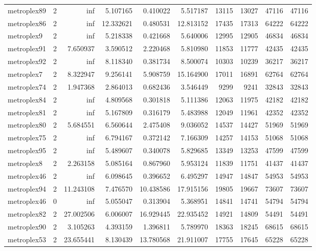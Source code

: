 \begin{longtable}{|l|r|r|r|r|r|r|r|r|r|}
metroplex89 & 2 & inf & 5.107165 & 0.410022 & 5.517187 & 13115 & 13027 & 47116 & 47116 \\
metroplex86 & 2 & inf & 12.332621 & 0.480531 & 12.813152 & 17435 & 17313 & 64222 & 64222 \\
metroplex9 & 2 & inf & 5.218338 & 0.421668 & 5.640006 & 12995 & 12905 & 46834 & 46834 \\
metroplex91 & 2 & 7.650937 & 3.590512 & 2.220468 & 5.810980 & 11853 & 11777 & 42435 & 42435 \\
metroplex92 & 2 & inf & 8.118340 & 0.381734 & 8.500074 & 10303 & 10239 & 36217 & 36217 \\
metroplex7 & 2 & 8.322947 & 9.256141 & 5.908759 & 15.164900 & 17011 & 16891 & 62764 & 62764 \\
metroplex74 & 2 & 1.947368 & 2.864013 & 0.682436 & 3.546449 & 9299 & 9241 & 32843 & 32843 \\
metroplex84 & 2 & inf & 4.809568 & 0.301818 & 5.111386 & 12063 & 11975 & 42182 & 42182 \\
metroplex81 & 2 & inf & 5.167809 & 0.316179 & 5.483988 & 12049 & 11961 & 42352 & 42352 \\
metroplex80 & 2 & 5.684551 & 6.560644 & 2.475408 & 9.036052 & 14537 & 14427 & 51969 & 51969 \\
metroplex75 & 2 & inf & 6.794167 & 0.372142 & 7.166309 & 14257 & 14153 & 51068 & 51068 \\
metroplex95 & 2 & inf & 5.489607 & 0.340078 & 5.829685 & 13349 & 13253 & 47599 & 47599 \\
metroplex8 & 2 & 2.263158 & 5.085164 & 0.867960 & 5.953124 & 11839 & 11751 & 41437 & 41437 \\
metroplex46 & 2 & inf & 6.098645 & 0.396652 & 6.495297 & 14947 & 14847 & 54953 & 54953 \\
metroplex94 & 2 & 11.243108 & 7.476570 & 10.438586 & 17.915156 & 19805 & 19667 & 73607 & 73607 \\
metroplex46 & 0 & inf & 5.055047 & 0.313904 & 5.368951 & 14841 & 14741 & 54794 & 54794 \\
metroplex82 & 2 & 27.002506 & 6.006007 & 16.929445 & 22.935452 & 14921 & 14809 & 54491 & 54491 \\
metroplex90 & 2 & 3.105263 & 4.393159 & 1.396811 & 5.789970 & 18363 & 18245 & 68615 & 68615 \\
metroplex53 & 2 & 23.655441 & 8.130439 & 13.780568 & 21.911007 & 17755 & 17645 & 65228 & 65228 \\
\end{longtable}
